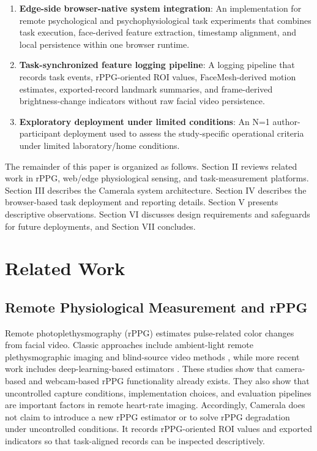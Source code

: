 \documentclass[dvipdfmx]{ehis}
\begin{document}
\begin{enumerate}
    \item \textbf{Edge-side browser-native system integration}: An implementation for remote psychological and psychophysiological task experiments that combines task execution, face-derived feature extraction, timestamp alignment, and local persistence within one browser runtime.
    \item \textbf{Task-synchronized feature logging pipeline}: A logging pipeline that records task events, rPPG-oriented ROI values, FaceMesh-derived motion estimates, exported-record landmark summaries, and frame-derived brightness-change indicators without raw facial video persistence.
    \item \textbf{Exploratory deployment under limited conditions}: An N=1 author-participant deployment used to assess the study-specific operational criteria under limited laboratory/home conditions.
\end{enumerate}

The remainder of this paper is organized as follows.
Section II reviews related work in rPPG, web/edge physiological sensing, and task-measurement platforms.
Section III describes the Camerala system architecture.
Section IV describes the browser-based task deployment and reporting details.
Section V presents descriptive observations.
Section VI discusses design requirements and safeguards for future deployments, and Section VII concludes.

\section{Related Work}

\subsection{Remote Physiological Measurement and rPPG}
Remote photoplethysmography (rPPG) estimates pulse-related color changes from facial video.
Classic approaches include ambient-light remote plethysmographic imaging and blind-source video methods \cite{verkruysse2008,poh_ica}, while more recent work includes deep-learning-based estimators \cite{deepphys}.
These studies show that camera-based and webcam-based rPPG functionality already exists.
They also show that uncontrolled capture conditions, implementation choices, and evaluation pipelines are important factors in remote heart-rate imaging.
Accordingly, Camerala does not claim to introduce a new rPPG estimator or to solve rPPG degradation under uncontrolled conditions.
It records rPPG-oriented ROI values and exported indicators so that task-aligned records can be inspected descriptively.
\end{document}
